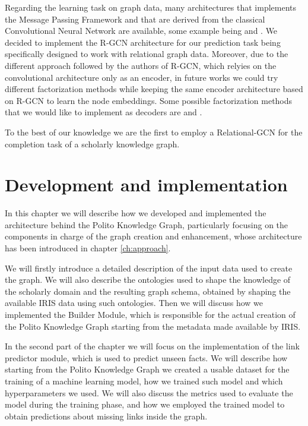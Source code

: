 \documentclass[%
    corpo=13.5pt,
    twoside,
    oldstyle,
    tipotesi=magistrale,
    greek,
    evenboxes
]{toptesi}
\begin{document}
Regarding the learning task on graph data, many architectures that implements
the Message Passing Framework\cite{gilmer2017} and that are derived from the
classical Convolutional Neural Network are available, some example being
\cite{defferrard2016} and \cite{duvenaud2015}.
We decided to implement the R-GCN architecture for our prediction task
being specifically designed to work with relational graph data.
Moreover, due to the different approach followed by the authors of R-GCN, which
relyies on the convolutional architecture only as an encoder, in future works
we could try different factorization methods while keeping the same encoder
architecture based on R-GCN to learn the node embeddings.
Some possible factorization methods that we would like to implement
as decoders are \cite{kazemi2018} and \cite{trouillon2016}.

To the best of our knowledge we are the first to employ a
Relational-GCN for the completion task of a scholarly knowledge graph.




\chapter{Development and implementation}

In this chapter we will describe how we developed and implemented the
architecture behind the Polito Knowledge Graph, particularly focusing
on the components in charge of the graph creation and enhancement, whose
architecture has been introduced in chapter \ref{ch:approach}.

We will firstly introduce a detailed description of the input data used to
create the graph. We will also describe the ontologies used to shape the
knowledge of the scholarly domain and the resulting graph schema, obtained
by shaping the available IRIS data using such ontologies.
Then we will discuss how we implemented the Builder Module, which is
responsible for the actual creation of the Polito Knowledge Graph starting
from the metadata made available by IRIS.

In the second part of the chapter we will focus on the implementation of the
link predictor module, which is used to predict unseen facts.
We will describe how starting from the Polito Knowledge Graph we created
a usable dataset for the training of a machine learning model, how we
trained such model and which hyperparameters we used. We will also discuss
the metrics used to evaluate the model during the training phase, and how we
employed the trained model to obtain predictions about missing links
inside the graph.
\end{document}
